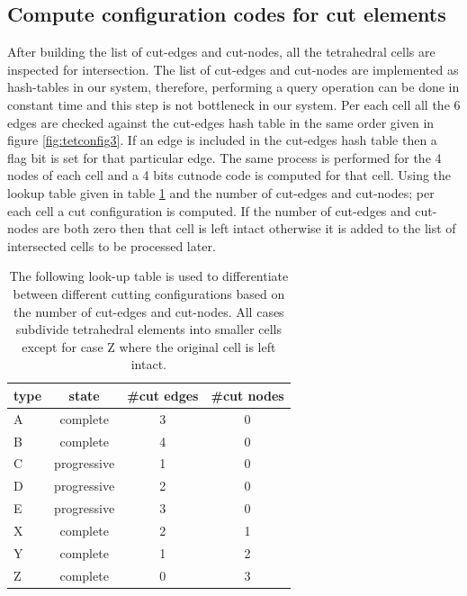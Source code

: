 \subsection{Compute configuration codes for cut elements}
After building the list of cut-edges and cut-nodes, all the tetrahedral cells are inspected for intersection. 
The list of cut-edges and cut-nodes are implemented as hash-tables in our system, therefore, performing a query operation can be done 
in constant time and this step is not bottleneck in our system. Per each cell all the 6 edges are checked against the cut-edges hash table 
in the same order given in figure \ref{fig:tetconfig3}. If an edge is included in the cut-edges hash table then a flag bit is set for that
particular edge. The same process is performed for the 4 nodes of each cell and a 4 bits cutnode code is computed for that cell.
Using the lookup table given in table \ref{table:allcutconfigs} and the number of cut-edges and cut-nodes; per each cell a cut configuration
is computed.  If the number of cut-edges and cut-nodes are both zero then that cell is left intact otherwise it is added to the list of intersected cells
to be processed later.

\begin{table}[H]
\begin{center}
\caption{\label{table:allcutconfigs}{The following look-up table is used to differentiate between different cutting configurations based on
the number of cut-edges and cut-nodes. All cases subdivide tetrahedral elements into smaller cells except for case Z where the original
cell is left intact.}}
  \begin{tabular}{ | l | c | c | c | }
    \hline    
    type & state & \#cut edges & \#cut nodes \\ \hline \hline    
    A & complete & 3 & 0 \\ \hline
    B & complete & 4 & 0 \\ \hline
    C & progressive & 1 & 0 \\ \hline
    D & progressive & 2 & 0 \\ \hline
    E & progressive & 3 & 0 \\ \hline
    X & complete & 2 & 1 \\ \hline
    Y & complete & 1 & 2 \\ \hline
    Z & complete & 0 & 3 \\ \hline
    \hline
  \end{tabular}
\end{center}
\end{table}


